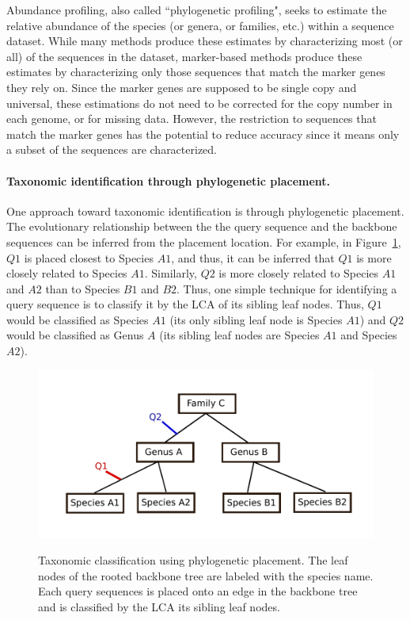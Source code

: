Abundance profiling, also called ``phylogenetic profiling", 
seeks to estimate the relative
abundance of the species (or
genera, or families, etc.) within a sequence dataset.
While many methods produce these estimates by characterizing
most (or all) of the sequences in the dataset, marker-based methods
produce these estimates by characterizing only those
sequences that match the marker genes they rely on.
Since the marker genes are supposed to be single
copy and universal, these estimations do not need to
be corrected for the copy number in each genome, or for
missing data. 
However, the restriction to sequences that match the marker genes
has the potential to reduce accuracy since it means only a subset
of the sequences are characterized.

\paragraph{Taxonomic identification through phylogenetic placement.}
One approach toward taxonomic identification is through phylogenetic placement.  The evolutionary relationship between the the query sequence and the backbone sequences can be inferred from the placement location.  For example, in Figure~\ref{tipp:placement}, $Q1$ is placed closest to Species $A1$, and thus, it can be inferred that $Q1$ is more closely related to Species $A1$.  Similarly, $Q2$ is more closely related to Species $A1$ and $A2$ than to Species $B1$ and $B2$.  Thus, one simple technique for identifying a query sequence is to classify it by the LCA of its sibling leaf nodes.  Thus, $Q1$ would be classified as Species $A1$ (its only sibling leaf node is Species $A1$) and $Q2$ would be classified as Genus $A$ (its sibling leaf nodes are Species $A1$ and Species $A2$).  

\begin{figure}[htpb]
\begin{center}
{\includegraphics[scale=0.8]{tipp/placement.pdf}}
\end{center}
\caption[Taxonomic classification using phylogenetic placement]{\label{tipp:placement} Taxonomic classification using phylogenetic placement.  The leaf nodes of the rooted backbone tree are labeled with the species name.  Each query sequences is placed onto an edge in the backbone tree and is classified by the LCA its sibling leaf nodes.}
\end{figure}

